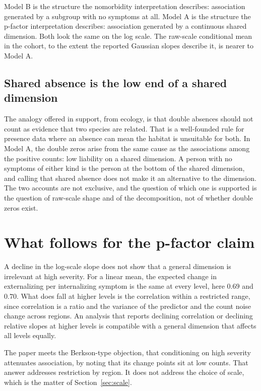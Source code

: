 \documentclass[11pt]{article}
\theoremstyle{definition}
\begin{document}
Model B is the structure the nomorbidity interpretation describes: association generated by a subgroup with no symptoms at all. Model A is the structure the p-factor interpretation describes: association generated by a continuous shared dimension. Both look the same on the log scale. The raw-scale conditional mean in the cohort, to the extent the reported Gaussian slopes describe it, is nearer to Model A.

\subsection*{Shared absence is the low end of a shared dimension}

The analogy offered in support, from ecology, is that double absences should not count as evidence that two species are related. That is a well-founded rule for presence data where an absence can mean the habitat is unsuitable for both. In Model A, the double zeros arise from the same cause as the associations among the positive counts: low liability on a shared dimension. A person with no symptoms of either kind is the person at the bottom of the shared dimension, and calling that shared absence does not make it an alternative to the dimension. The two accounts are not exclusive, and the question of which one is supported is the question of raw-scale shape and of the decomposition, not of whether double zeros exist.

\section{What follows for the p-factor claim}

A decline in the log-scale slope does not show that a general dimension is irrelevant at high severity. For a linear mean, the expected change in externalizing per internalizing symptom is the same at every level, here $0.69$ and $0.70$. What does fall at higher levels is the correlation within a restricted range, since correlation is a ratio and the variance of the predictor and the count noise change across regions. An analysis that reports declining correlation or declining relative slopes at higher levels is compatible with a general dimension that affects all levels equally.

The paper meets the Berkson-type objection, that conditioning on high severity attenuates association, by noting that its change points sit at low counts. That answer addresses restriction by region. It does not address the choice of scale, which is the matter of Section~\ref{sec:scale}.
\end{document}
